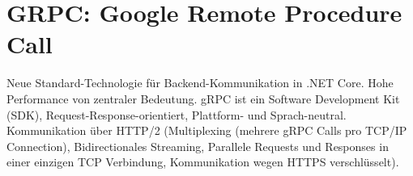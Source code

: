 \documentclass[
a4paper,
oneside,
10pt,
fleqn,
headsepline,
toc=listofnumbered, 
bibliography=totocnumbered]{scrartcl}
\let\stdsection\section
\renewcommand\section{\clearpage\stdsection}
\begin{document}








\section{GRPC: Google Remote Procedure Call}
Neue Standard-Technologie für Backend-Kommunikation in .NET Core. Hohe Performance von zentraler Bedeutung. gRPC ist ein Software Development Kit (SDK), Request-Response-orientiert, Plattform- und Sprach-neutral.
Kommunikation über HTTP/2 (Multiplexing (mehrere gRPC Calls pro TCP/IP Connection), Bidirectionales Streaming, Parallele Requests und Responses in einer einzigen TCP Verbindung, Kommunikation wegen HTTPS verschlüsselt).
\end{document}
